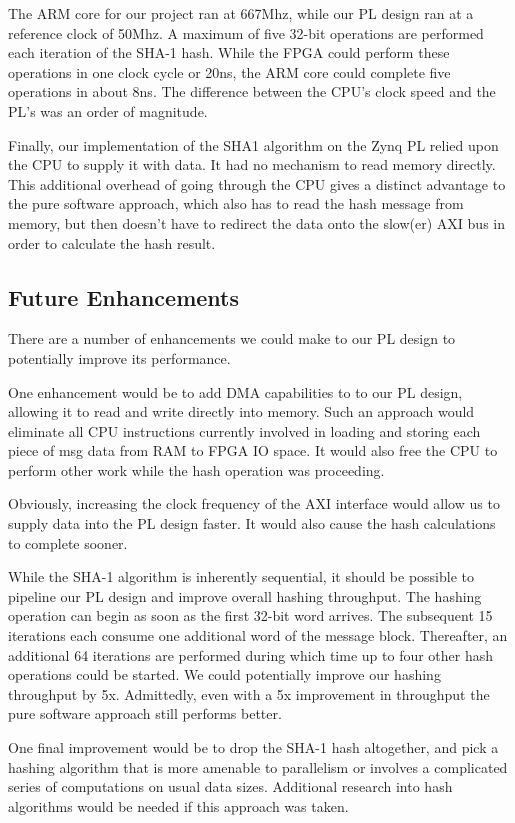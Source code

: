 \documentclass[journal]{IEEEtran}
\begin{document}
The ARM core for our project ran at 667Mhz, while our PL design ran at a reference clock of 50Mhz.  A maximum of five 32-bit operations are performed each iteration of the SHA-1 hash.  While the FPGA could perform these operations in one clock cycle or 20ns, the ARM core could complete five operations in about 8ns.  The difference between the CPU’s clock speed and the PL’s was an order of magnitude.

Finally, our implementation of the SHA1 algorithm on the Zynq PL relied upon the CPU to supply it with data.  It had no mechanism to read memory directly.  This additional overhead of going through the CPU gives a distinct advantage to the pure software approach, which also has to read the hash message from memory, but then doesn’t have to redirect the data onto the slow(er) AXI bus in order to calculate the hash result.
\subsection{Future Enhancements}
There are a number of enhancements we could make to our PL design to potentially improve its performance.

One enhancement would be to add DMA capabilities to to our PL design, allowing it to read and write directly into memory.  Such an approach would eliminate all CPU instructions currently involved in loading and storing each piece of msg data from RAM to FPGA IO space.  It would also free the CPU to perform other work while the hash operation was proceeding.

Obviously, increasing the clock frequency of the AXI interface would allow us to supply data into the PL design faster.  It would also cause the hash calculations to complete sooner.

While the SHA-1 algorithm is inherently sequential, it should be possible to pipeline our PL design and improve overall hashing throughput.  The hashing operation can begin as soon as the first 32-bit word arrives.  The subsequent 15 iterations each consume one additional word of the message block.  Thereafter, an additional 64 iterations are performed during which time up to four other hash operations could be started.  We could potentially improve our hashing throughput by 5x.  Admittedly, even with a 5x improvement in throughput the pure software approach still performs better.

One final improvement would be to drop the SHA-1 hash altogether, and pick a hashing algorithm that is more amenable to parallelism or involves a complicated series of computations on usual data sizes.  Additional research into hash algorithms would be needed if this approach was taken.
\end{document}
